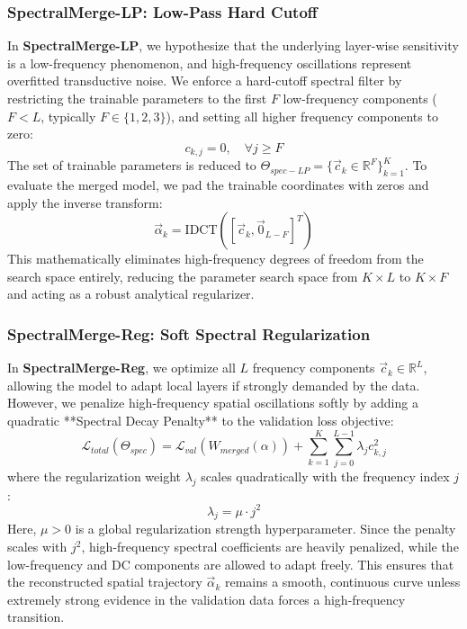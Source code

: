 \subsubsection{SpectralMerge-LP: Low-Pass Hard Cutoff}
In \textbf{SpectralMerge-LP}, we hypothesize that the underlying layer-wise sensitivity is a low-frequency phenomenon, and high-frequency oscillations represent overfitted transductive noise. We enforce a hard-cutoff spectral filter by restricting the trainable parameters to the first $F$ low-frequency components ($F < L$, typically $F \in \{1, 2, 3\}$), and setting all higher frequency components to zero:
\begin{equation}
    c_{k, j} = 0, \quad \forall j \ge F
\end{equation}
The set of trainable parameters is reduced to $\Theta_{spec-LP} = \{\vec{c}_k \in \mathbb{R}^F\}_{k=1}^K$. To evaluate the merged model, we pad the trainable coordinates with zeros and apply the inverse transform:
\begin{equation}
    \vec{\alpha}_k = \text{IDCT}\left([\vec{c}_k, \vec{0}_{L-F}]^T\right)
\end{equation}
This mathematically eliminates high-frequency degrees of freedom from the search space entirely, reducing the parameter search space from $K \times L$ to $K \times F$ and acting as a robust analytical regularizer.

\subsubsection{SpectralMerge-Reg: Soft Spectral Regularization}
In \textbf{SpectralMerge-Reg}, we optimize all $L$ frequency components $\vec{c}_k \in \mathbb{R}^L$, allowing the model to adapt local layers if strongly demanded by the data. However, we penalize high-frequency spatial oscillations softly by adding a quadratic **Spectral Decay Penalty** to the validation loss objective:
\begin{equation}
    \mathcal{L}_{total}(\Theta_{spec}) = \mathcal{L}_{val}\left(W_{merged}(\alpha)\right) + \sum_{k=1}^K \sum_{j=0}^{L-1} \lambda_j c_{k,j}^2
\end{equation}
where the regularization weight $\lambda_j$ scales quadratically with the frequency index $j$:
\begin{equation}
    \lambda_j = \mu \cdot j^2
\end{equation}
Here, $\mu > 0$ is a global regularization strength hyperparameter. Since the penalty scales with $j^2$, high-frequency spectral coefficients are heavily penalized, while the low-frequency and DC components are allowed to adapt freely. This ensures that the reconstructed spatial trajectory $\vec{\alpha}_k$ remains a smooth, continuous curve unless extremely strong evidence in the validation data forces a high-frequency transition.

